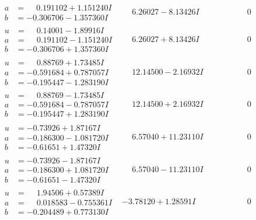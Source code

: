 \documentclass[1p]{elsarticle_modified}
\theoremstyle{definition}
\begin{document}
$$\begin{array}{c|c|c}
\begin{aligned}
a &= \phantom{-}0.191102 + 1.151240 I \\
b &= -0.306706 - 1.357360 I\end{aligned}
 & \phantom{-}6.26027 - 8.13426 I & \phantom{-0.000000 } 0 \\ \hline\begin{aligned}
u &= \phantom{-}0.14001 - 1.89916 I \\
a &= \phantom{-}0.191102 - 1.151240 I \\
b &= -0.306706 + 1.357360 I\end{aligned}
 & \phantom{-}6.26027 + 8.13426 I & \phantom{-0.000000 } 0 \\ \hline\begin{aligned}
u &= \phantom{-}0.88769 + 1.73485 I \\
a &= -0.591684 + 0.787057 I \\
b &= -0.195447 - 1.283190 I\end{aligned}
 & \phantom{-}12.14500 - 2.16932 I & \phantom{-0.000000 } 0 \\ \hline\begin{aligned}
u &= \phantom{-}0.88769 - 1.73485 I \\
a &= -0.591684 - 0.787057 I \\
b &= -0.195447 + 1.283190 I\end{aligned}
 & \phantom{-}12.14500 + 2.16932 I & \phantom{-0.000000 } 0 \\ \hline\begin{aligned}
u &= -0.73926 + 1.87167 I \\
a &= -0.186300 - 1.081720 I \\
b &= -0.61651 + 1.47320 I\end{aligned}
 & \phantom{-}6.57040 + 11.23110 I & \phantom{-0.000000 } 0 \\ \hline\begin{aligned}
u &= -0.73926 - 1.87167 I \\
a &= -0.186300 + 1.081720 I \\
b &= -0.61651 - 1.47320 I\end{aligned}
 & \phantom{-}6.57040 - 11.23110 I & \phantom{-0.000000 } 0 \\ \hline\begin{aligned}
u &= \phantom{-}1.94506 + 0.57389 I \\
a &= \phantom{-}0.018583 - 0.755361 I \\
b &= -0.204489 + 0.773130 I\end{aligned}
 & -3.78120 + 1.28591 I & \phantom{-0.000000 } 0 \\ \hline\begin{aligned}

\end{aligned}
\end{array}$$
\end{document}
